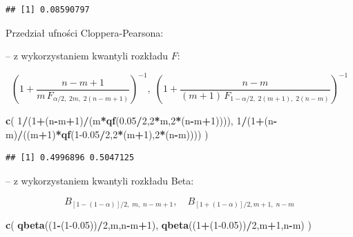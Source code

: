 \documentclass[polish,]{book}
\newenvironment{Shaded}{\begin{snugshade}}{\end{snugshade}}
\newcommand{\DecValTok}[1]{\textcolor[rgb]{0.00,0.00,0.81}{#1}}
\newcommand{\FloatTok}[1]{\textcolor[rgb]{0.00,0.00,0.81}{#1}}
\newcommand{\KeywordTok}[1]{\textcolor[rgb]{0.13,0.29,0.53}{\textbf{#1}}}
\newcommand{\NormalTok}[1]{#1}
\newcommand{\OperatorTok}[1]{\textcolor[rgb]{0.81,0.36,0.00}{\textbf{#1}}}
\begin{document}
\begin{verbatim}
## [1] 0.08590797
\end{verbatim}

Przedział ufności Cloppera-Pearsona:

-- z wykorzystaniem kwantyli rozkładu \(F\):

\begin{equation}
\left(1+\frac{n-m+1}{m\,F_{\alpha/2,\;2m,\;2(n-m+1)}}\right)^{-1},\;\left(1+\frac{n-m}{(m+1)\,F_{1-\alpha/2,\;2(m+1),\;2(n-m)}}\right)^{-1}
\label{eq:wz1154}
\end{equation}

\begin{Shaded}
\begin{Highlighting}[]
\KeywordTok{c}\NormalTok{( }\DecValTok{1}\OperatorTok{/}\NormalTok{(}\DecValTok{1}\OperatorTok{+}\NormalTok{(n}\OperatorTok{-}\NormalTok{m}\OperatorTok{+}\DecValTok{1}\NormalTok{)}\OperatorTok{/}\NormalTok{(m}\OperatorTok{*}\KeywordTok{qf}\NormalTok{(}\FloatTok{0.05}\OperatorTok{/}\DecValTok{2}\NormalTok{,}\DecValTok{2}\OperatorTok{*}\NormalTok{m,}\DecValTok{2}\OperatorTok{*}\NormalTok{(n}\OperatorTok{-}\NormalTok{m}\OperatorTok{+}\DecValTok{1}\NormalTok{)))),}
   \DecValTok{1}\OperatorTok{/}\NormalTok{(}\DecValTok{1}\OperatorTok{+}\NormalTok{(n}\OperatorTok{-}\NormalTok{m)}\OperatorTok{/}\NormalTok{((m}\OperatorTok{+}\DecValTok{1}\NormalTok{)}\OperatorTok{*}\KeywordTok{qf}\NormalTok{(}\DecValTok{1}\FloatTok{-0.05}\OperatorTok{/}\DecValTok{2}\NormalTok{,}\DecValTok{2}\OperatorTok{*}\NormalTok{(m}\OperatorTok{+}\DecValTok{1}\NormalTok{),}\DecValTok{2}\OperatorTok{*}\NormalTok{(n}\OperatorTok{-}\NormalTok{m)))) )}
\end{Highlighting}
\end{Shaded}

\begin{verbatim}
## [1] 0.4996896 0.5047125
\end{verbatim}

-- z wykorzystaniem kwantyli rozkładu Beta:

\begin{equation}
B_{[1-(1-\alpha)]/2,\;m,\;n-m+1},\quad B_{[1+(1-\alpha)]/2,m+1,\;n-m}
\label{eq:wz1155}
\end{equation}

\begin{Shaded}
\begin{Highlighting}[]
\KeywordTok{c}\NormalTok{( }\KeywordTok{qbeta}\NormalTok{((}\DecValTok{1}\OperatorTok{-}\NormalTok{(}\DecValTok{1}\FloatTok{-0.05}\NormalTok{))}\OperatorTok{/}\DecValTok{2}\NormalTok{,m,n}\OperatorTok{-}\NormalTok{m}\OperatorTok{+}\DecValTok{1}\NormalTok{), }\KeywordTok{qbeta}\NormalTok{((}\DecValTok{1}\OperatorTok{+}\NormalTok{(}\DecValTok{1}\FloatTok{-0.05}\NormalTok{))}\OperatorTok{/}\DecValTok{2}\NormalTok{,m}\OperatorTok{+}\DecValTok{1}\NormalTok{,n}\OperatorTok{-}\NormalTok{m) )}
\end{Highlighting}
\end{Shaded}
\end{document}
